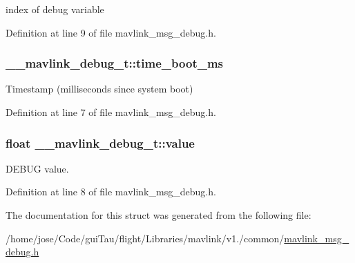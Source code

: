index of debug variable 



Definition at line 9 of file mavlink\-\_\-msg\-\_\-debug.\-h.

\hypertarget{struct____mavlink__debug__t_afc1d1057d77ded488ac7b5034411604c}{
\subsubsection[{time\-\_\-boot\-\_\-ms}]{ \-\_\-\-\_\-mavlink\-\_\-debug\-\_\-t\-::time\-\_\-boot\-\_\-ms}}\label{struct____mavlink__debug__t_afc1d1057d77ded488ac7b5034411604c}


Timestamp (milliseconds since system boot) 



Definition at line 7 of file mavlink\-\_\-msg\-\_\-debug.\-h.

\hypertarget{struct____mavlink__debug__t_aef9d0e91db46dff84494856146dcbcbe}{
\subsubsection[{value}]{\setlength{\rightskip}{0pt plus 5cm}float \-\_\-\-\_\-mavlink\-\_\-debug\-\_\-t\-::value}}\label{struct____mavlink__debug__t_aef9d0e91db46dff84494856146dcbcbe}


D\-E\-B\-U\-G value. 



Definition at line 8 of file mavlink\-\_\-msg\-\_\-debug.\-h.



The documentation for this struct was generated from the following file\-:\begin{DoxyCompactItemize}
\item 
/home/jose/\-Code/gui\-Tau/flight/\-Libraries/mavlink/v1./common/\hyperlink{mavlink__msg__debug_8h}{mavlink\-\_\-msg\-\_\-debug.\-h}\end{DoxyCompactItemize}
